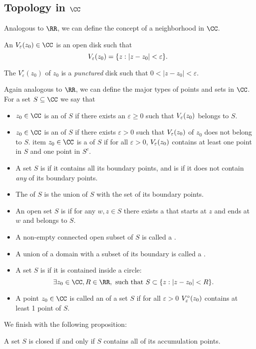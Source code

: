 \subsection{Topology in $\CC$}
Analogous to $\RR$, we can define the concept of a neighborhood in $\CC$. 
\begin{definition}
An  $\epsn \in \CC$ is an open disk such that 
\[ V_{\varepsilon}(z_0) = \{ z : |z - z_0| < \varepsilon \}. \] 

The  $V^\circ_\varepsilon(z_0)$ of $z_0$ is a \emph{punctured} disk such that $0 < |z - z_0| < \varepsilon$. 
\end{definition}

Again analogous to $\RR$, we can define the major types of points and sets in $\CC$. \newline
For a set $S \subseteq \CC$ we say that
\begin{itemize}
\item $z_0 \in \CC$ is an  of $S$ if there exists an $\varepsilon \geq 0$ such that $V_{\varepsilon}(z_0)$ belongs to $S$. 
\item $z_0 \in \CC$ is an  of $S$ if there exists $\varepsilon > 0$ such that $V_{\varepsilon}(z_0)$ of $z_0$ does not belong to $S$. 
item $z_0 \in \CC$ is a  of $S$ if for all $\varepsilon > 0$, $V_{\varepsilon}(z_0)$ contains at least one point in $S$ and one point in $S^c$. 
\item A set $S$ is  if it contains all its boundary points, and is  if it does not contain \emph{any} of its boundary points. 
\item The  of $S$ is the union of $S$ with the set of its boundary points. 
\item An open set $S$ is  if for any $w,z \in S$ there exists a  that starts at $z$ and ends at $w$ and belongs to $S$. 
\item A non-empty connected open subset of $S$ is called a . 
\item A union of a domain with a subset of its boundary is called a . 
\item A set $S$ is  if it is contained inside a circle: 
\[ \exists z_0 \in \CC, R \in \RR, \text{ such that } S \subset \{ z : |z-z_0| < R \}. \] 
\item A point $z_0 \in \CC$ is called an  of a set $S$ if for all $\varepsilon > 0$ $V^\circ_{\varepsilon}(z_0)$ contains at least 1 point of $S$.
\end{itemize}

We finish with the following proposition: 
\begin{proposition}
A set $S$ is closed if and only if $S$ contains all of its accumulation points. 
\end{proposition}


